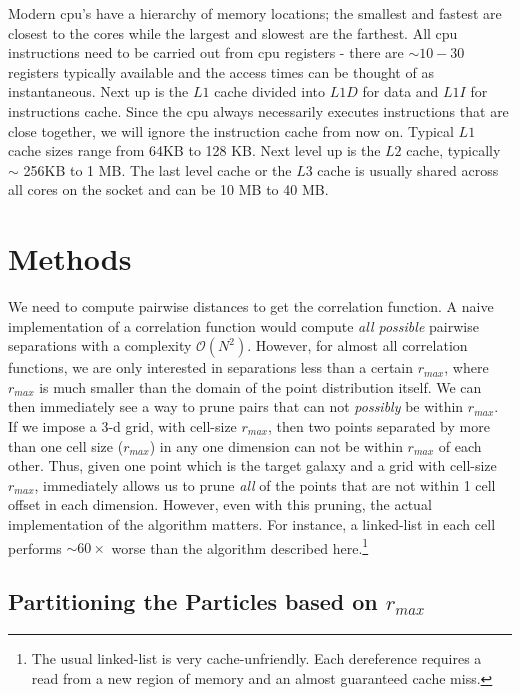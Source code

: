 \documentclass[preprint,authoryear,12pt]{elsarticle}
\newcommand{\rmax}{\ensuremath{{r_{max}}}\xspace}
\begin{document}
Modern cpu's have a hierarchy of memory locations; the smallest and fastest are closest to the cores while the largest and slowest are the
farthest. All cpu instructions need to be carried out from cpu registers - there are $\sim 10-30$ registers typically available and the 
access times can be thought of as instantaneous. Next up is the $L1$ cache divided into $L1D$ for data and $L1I$ for instructions cache. Since 
the cpu always necessarily executes instructions that are close together, we will ignore the instruction cache from now on. Typical $L1$ cache 
sizes range from 64KB to 128 KB. Next level up is the $L2$ cache, typically $\sim$ 256KB to 1 MB. The last level cache or the $L3$ cache 
is usually shared across all cores on the socket and can be 10 MB to 40 MB. 


\section{Methods}
We need to compute pairwise distances to get the correlation function. A naive implementation of a correlation function would compute {\em all possible} 
pairwise separations with a complexity $\mathcal{O}(N^2)$. However, for almost all correlation functions, we are only interested in separations less than 
a certain \rmax, where \rmax is much smaller than the domain of the point distribution itself. We can then immediately see a way to prune pairs that can not
{\em possibly} be within \rmax. If we impose a 3-d grid, with cell-size \rmax, then two points separated by more than one cell size (\rmax) in any one 
dimension can not be within \rmax of each other. Thus, given one point which is the target galaxy and a grid with cell-size \rmax, 
immediately allows us to prune {\em all} of the points that are not within 1 cell offset in each dimension. However, even with this pruning, the actual 
implementation of the algorithm matters. For instance, a linked-list in each cell performs $\sim 60\times$ worse than the algorithm described here.\footnote{The 
usual linked-list is very cache-unfriendly. Each dereference requires a read from a new region of memory and an almost guaranteed cache miss. } 

\subsection{Partitioning the Particles based on \rmax}
\end{document}
